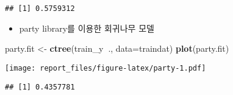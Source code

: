 \documentclass[]{article}
\newenvironment{Shaded}{\begin{snugshade}}{\end{snugshade}}
\newcommand{\DataTypeTok}[1]{\textcolor[rgb]{0.13,0.29,0.53}{#1}}
\newcommand{\DecValTok}[1]{\textcolor[rgb]{0.00,0.00,0.81}{#1}}
\newcommand{\KeywordTok}[1]{\textcolor[rgb]{0.13,0.29,0.53}{\textbf{#1}}}
\newcommand{\NormalTok}[1]{#1}
\newcommand{\OperatorTok}[1]{\textcolor[rgb]{0.81,0.36,0.00}{\textbf{#1}}}
\newcommand{\StringTok}[1]{\textcolor[rgb]{0.31,0.60,0.02}{#1}}
\providecommand{\tightlist}{%
  \setlength{\itemsep}{0pt}\setlength{\parskip}{0pt}}
\begin{document}
\begin{Shaded}
\end{Shaded}

\begin{verbatim}
## [1] 0.5759312
\end{verbatim}

\begin{itemize}
\tightlist
\item
  party library를 이용한 회귀나무 모델
\end{itemize}

\begin{Shaded}
\begin{Highlighting}[]
\NormalTok{party.fit <-}\StringTok{ }\KeywordTok{ctree}\NormalTok{(train_y}\OperatorTok{~}\NormalTok{., }\DataTypeTok{data=}\NormalTok{traindat)}
\KeywordTok{plot}\NormalTok{(party.fit)}
\end{Highlighting}
\end{Shaded}

\texttt{[image: report\_files/figure-latex/party-1.pdf]}

\begin{Shaded}
\end{Shaded}

\begin{verbatim}
## [1] 0.4357781
\end{verbatim}

\begin{Shaded}
\end{Shaded}
\end{document}
